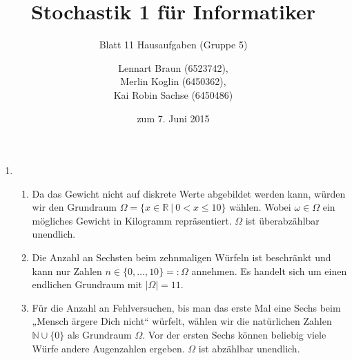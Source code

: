 \documentclass[a4paper]{scrartcl}
\title{Stochastik 1 für Informatiker}
\subtitle{Blatt 11 Hausaufgaben (Gruppe 5)}
\author{
    Lennart Braun (6523742), \\
    Merlin Koglin (6450362), \\
    Kai Robin Sachse (6450486)
}
\date{zum 7. Juni 2015}
\begin{document}
\maketitle

\begin{enumerate}[label=\bfseries\arabic*.]
    \item
        \begin{enumerate}[label=(\alph*)]
            \item
                Da das Gewicht nicht auf diskrete Werte abgebildet werden kann,
                würden wir den Grundraum
                $\Omega = \{ x \in \mathbb{R}\ |\ 0 < x \leq 10 \}$ wählen. 
                Wobei $\omega \in \Omega$ ein mögliches Gewicht in Kilogramm
                repräsentiert.
                $\Omega$ ist überabzählbar unendlich.

            \item
                Die Anzahl an Sechsten beim zehnmaligen Würfeln ist beschränkt
                und kann nur Zahlen $n \in \{0, \dotsc, 10\} =: \Omega$
                annehmen.
                Es handelt sich um einen endlichen Grundraum mit
                $|\Omega| = 11$.

            \item
                Für die Anzahl an Fehlversuchen, bis man das erste Mal eine
                Sechs beim „Mensch ärgere Dich nicht“ würfelt, wählen wir die
                natürlichen Zahlen $\mathbb{N} \cup \{0\}$ als Grundraum
                $\Omega$.
                Vor der ersten Sechs können beliebig viele Würfe andere
                Augenzahlen ergeben.
                $\Omega$ ist abzählbar unendlich.
                

        \end{enumerate}


\end{enumerate}
\end{document}
